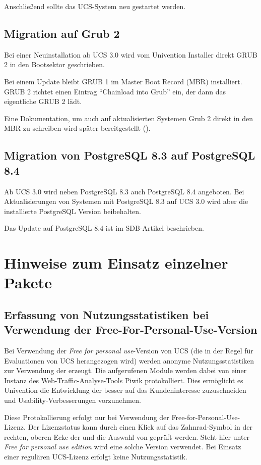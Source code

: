 Anschließend sollte das UCS-System neu gestartet werden.

\section{Migration auf Grub 2}

Bei einer Neuinstallation ab UCS 3.0 wird vom Univention Installer direkt GRUB 2 in den
Bootsektor geschrieben.

Bei einem Update bleibt GRUB 1 im Master Boot Record (MBR) installiert. GRUB 2
richtet einen Eintrag ``Chainload into Grub'' ein, der dann das eigentliche
GRUB 2 lädt.

Eine Dokumentation, um auch auf aktualisierten Systemen Grub 2 direkt
in den MBR zu schreiben wird später bereitgestellt ().

\section{Migration von PostgreSQL 8.3 auf PostgreSQL 8.4}
Ab UCS 3.0 wird neben PostgreSQL 8.3 auch PostgreSQL 8.4
angeboten. Bei Aktualisierungen von Systemen mit PostgreSQL 8.3 auf
UCS 3.0 wird aber die installierte PostgreSQL Version beibehalten.

Das Update auf PostgreSQL 8.4 ist im
SDB-Artikel  beschrieben.

\chapter{Hinweise zum Einsatz einzelner Pakete}

\section{Erfassung von Nutzungsstatistiken bei Verwendung der Free-For-Personal-Use-Version}
Bei Verwendung der  \emph{Free for personal use}-Version
von UCS (die in der Regel für Evaluationen von UCS herangezogen wird)
werden anonyme Nutzungsstatistiken zur Verwendung der \ucsUMC{}
erzeugt. Die aufgerufenen Module werden dabei von einer Instanz des
Web-Traffic-Analyse-Tools Piwik protokolliert. Dies ermöglicht es
Univention die Entwicklung der \ucsUMC{} besser auf das
Kundeninteresse zuzuschneiden und Usability-Verbesserungen vorzunehmen.

Diese Protokollierung erfolgt nur bei Verwendung der 
Free-for-Personal-Use-Lizenz. Der Lizenzstatus kann durch einen
Klick auf das Zahnrad-Symbol in der rechten, oberen Ecke der \ucsUMC{}
und die Auswahl von  geprüft werden. Steht hier
unter  \emph{Free for personal use edition}
wird eine solche Version verwendet. Bei Einsatz einer regulären
UCS-Lizenz erfolgt keine Nutzungsstatistik.

